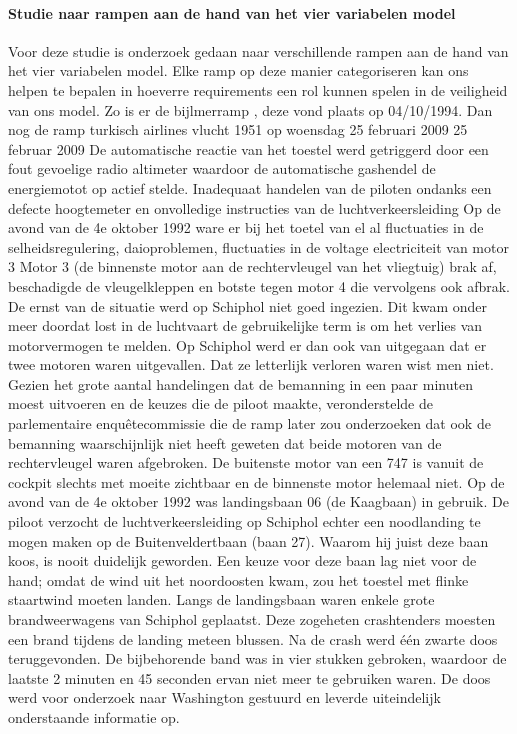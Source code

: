\paragraph{Studie naar rampen aan de hand van het vier variabelen model}
\newline \indent Voor deze studie is onderzoek gedaan naar verschillende rampen aan de hand van het vier variabelen model.
Elke ramp op deze manier categoriseren  kan ons helpen te bepalen in hoeverre requirements een rol kunnen spelen in de veiligheid van ons model.  Zo is er de bijlmerramp \cite{aviationsafety04101992airplaneCrashBijlmer}
, deze vond plaats op 04/10/1994. Dan nog de  ramp turkisch airlines vlucht 1951 op woensdag 25 februari 2009
25 februar 2009
De automatische reactie van het toestel werd getriggerd door een fout gevoelige radio altimeter waardoor de automatische gashendel de energiemotot op actief stelde.
Inadequaat handelen van de piloten ondanks een defecte hoogtemeter en onvolledige instructies van de luchtverkeersleiding
\cite{catsr25022009Boeing737AmsterdamCrash}
\cite{zuilen23022019Tijdlijnpoldercrash}
\cite{wikinews04032009techfoutailines1951}
\cite{luchtvaartnieuws21012020boeing737conclusies}
\cite{adformatie280220209communicatiegebreken}
\cite{spinnael25022009onderzoekpolderbaancrash}
\cite{crashTurkishAirlines}
\cite{flightradar24}
\cite{flightstatstracker}
Op de avond van de 4e oktober 1992 ware er bij het toetel van el al fluctuaties in de selheidsregulering, daioproblemen, fluctuaties in de voltage electriciteit van motor 3
Motor 3 (de binnenste motor aan de rechtervleugel van het vliegtuig) brak af, beschadigde de vleugelkleppen en botste tegen motor 4 die vervolgens ook afbrak.
De ernst van de situatie werd op Schiphol niet goed ingezien. Dit kwam onder meer doordat lost in de luchtvaart de gebruikelijke term is om het verlies van motorvermogen te melden. Op Schiphol werd er dan ook van uitgegaan dat er twee motoren waren uitgevallen. Dat ze letterlijk verloren waren wist men niet. Gezien het grote aantal handelingen dat de bemanning in een paar minuten moest uitvoeren en de keuzes die de piloot maakte, veronderstelde de parlementaire enquêtecommissie die de ramp later zou onderzoeken dat ook de bemanning waarschijnlijk niet heeft geweten dat beide motoren van de rechtervleugel waren afgebroken. De buitenste motor van een 747 is vanuit de cockpit slechts met moeite zichtbaar en de binnenste motor helemaal niet.
Op de avond van de 4e oktober 1992 was landingsbaan 06 (de Kaagbaan) in gebruik. De piloot verzocht de luchtverkeersleiding op Schiphol echter een noodlanding te mogen maken op de Buitenveldertbaan (baan 27). Waarom hij juist deze baan koos, is nooit duidelijk geworden. Een keuze voor deze baan lag niet voor de hand; omdat de wind uit het noordoosten kwam, zou het toestel met flinke staartwind moeten landen. Langs de landingsbaan waren enkele grote brandweerwagens van Schiphol geplaatst. Deze zogeheten crashtenders moesten een brand tijdens de landing meteen blussen. Na de crash werd één zwarte doos teruggevonden. De bijbehorende band was in vier stukken gebroken, waardoor de laatste 2 minuten en 45 seconden ervan niet meer te gebruiken waren. De doos werd voor onderzoek naar Washington gestuurd en leverde uiteindelijk onderstaande informatie op.
